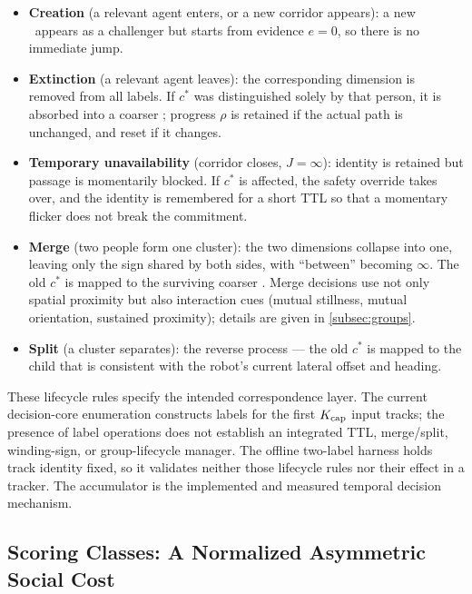 \begin{itemize}
\item \textbf{Creation} (a relevant agent enters, or a new corridor appears): a new \Class\ appears as a challenger but starts from evidence $e=0$, so there is no immediate jump.
\item \textbf{Extinction} (a relevant agent leaves): the corresponding dimension is removed from all labels. If $c^*$ was distinguished solely by that person, it is absorbed into a coarser \Class; progress $\rho$ is retained if the actual path is unchanged, and reset if it changes.
\item \textbf{Temporary unavailability} (corridor closes, $J=\infty$): identity is retained but passage is momentarily blocked. If $c^*$ is affected, the safety override takes over, and the identity is remembered for a short TTL so that a momentary flicker does not break the commitment.
\item \textbf{Merge} (two people form one cluster): the two dimensions collapse into one, leaving only the sign shared by both sides, with ``between'' becoming $\infty$. The old $c^*$ is mapped to the surviving coarser \Class. Merge decisions use not only spatial proximity but also interaction cues (mutual stillness, mutual orientation, sustained proximity); details are given in \cref{subsec:groups}.
\item \textbf{Split} (a cluster separates): the reverse process --- the old $c^*$ is mapped to the child that is consistent with the robot's current lateral offset and heading.
\end{itemize}



These lifecycle rules specify the intended correspondence layer. The current decision-core enumeration constructs labels for the first $K_{\rm cap}$ input tracks; the presence of label operations does not establish an integrated TTL, merge/split, winding-sign, or group-lifecycle manager. The offline two-label harness holds track identity fixed, so it validates neither those lifecycle rules nor their effect in a tracker. The accumulator is the implemented and measured temporal decision mechanism.


\subsection{Scoring Classes: A Normalized Asymmetric Social Cost}\label{subsec:cost}



